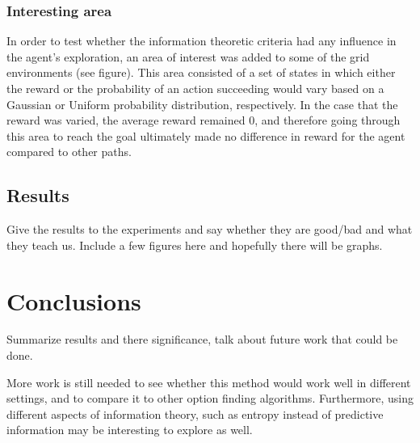 \documentclass{acm_proc_article-sp}
\begin{document}
\subsubsection{Interesting area}

In order to test whether the information theoretic criteria had any influence in the agent's exploration, an area of interest was added to some of the grid environments (see figure). This area consisted of a set of states in which either the reward or the probability of an action succeeding would vary based on a Gaussian or Uniform probability distribution, respectively. In the case that the reward was varied, the average reward remained 0, and therefore going through this area to reach the goal ultimately made no difference in reward for the agent compared to other paths.


\subsection{Results}

Give the results to the experiments and say whether they are good/bad and what they teach us. Include a few figures here and hopefully there will be graphs.




\section{Conclusions}

Summarize results and there significance, talk about future work that could be done.

More work is still needed to see whether this method would work well in different settings, and to compare it to other option finding algorithms. Furthermore, using different aspects of information theory, such as entropy instead of predictive information may be interesting to explore as well.

\end{document}
